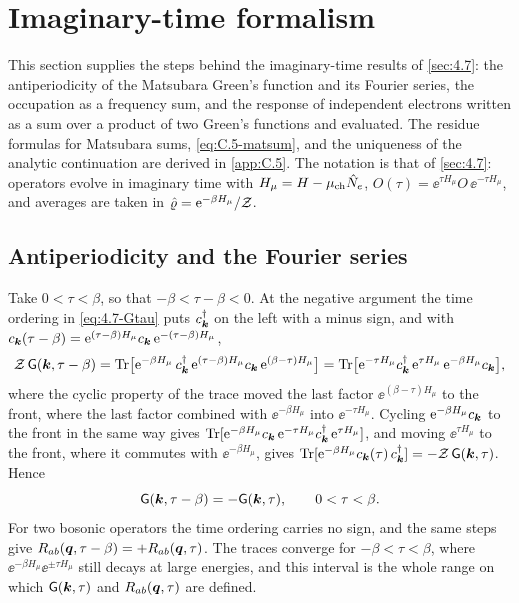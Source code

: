 \section{Imaginary-time formalism}\label{app:D.10}

This section supplies the steps behind the imaginary-time results of \cref{sec:4.7}: the antiperiodicity of the Matsubara Green's function and its Fourier series, the occupation as a frequency sum, and the response of independent electrons written as a sum over a product of two Green's functions and evaluated. The residue formulas for Matsubara sums, \cref{eq:C.5-matsum}, and the uniqueness of the analytic continuation are derived in \cref{app:C.5}. The notation is that of \cref{sec:4.7}: operators evolve in imaginary time with $H_\mu = H - \mu_{\mathrm{ch}}\hat{N}_e$, $O(\tau) = \ee^{\tau H_\mu}O\,\ee^{-\tau H_\mu}$, and averages are taken in $\hat{\varrho} = \mathrm{e}^{-\beta H_\mu}/\mathcal{Z}$.

\subsection*{Antiperiodicity and the Fourier series}

Take $0 < \tau < \beta$, so that $-\beta < \tau - \beta < 0$. At the negative argument the time ordering in \cref{eq:4.7-Gtau} puts $c^\dagger_{\bm{k}}$ on the left with a minus sign, and with $c_{\bm{k}}(\tau - \beta) = \mathrm{e}^{(\tau - \beta)H_\mu}c_{\bm{k}}\,\mathrm{e}^{-(\tau - \beta)H_\mu}$,
\begin{equation*}
  \mathcal{Z}\,\mathsf{G}(\bm{k},\tau - \beta) = \operatorname{Tr}\bigl[\mathrm{e}^{-\beta H_\mu}\,c^\dagger_{\bm{k}}\,\mathrm{e}^{(\tau - \beta)H_\mu}c_{\bm{k}}\,\mathrm{e}^{(\beta - \tau)H_\mu}\bigr]
  = \operatorname{Tr}\bigl[\mathrm{e}^{-\tau H_\mu}c^\dagger_{\bm{k}}\,\mathrm{e}^{\tau H_\mu}\,\mathrm{e}^{-\beta H_\mu}c_{\bm{k}}\bigr] ,
\end{equation*}
where the cyclic property of the trace moved the last factor $\ee^{(\beta - \tau)H_\mu}$ to the front, where the last factor combined with $\ee^{-\beta H_\mu}$ into $\ee^{-\tau H_\mu}$. Cycling $\mathrm{e}^{-\beta H_\mu}c_{\bm{k}}$ to the front in the same way gives $\operatorname{Tr}[\mathrm{e}^{-\beta H_\mu}c_{\bm{k}}\,\mathrm{e}^{-\tau H_\mu}c^\dagger_{\bm{k}}\,\mathrm{e}^{\tau H_\mu}]$, and moving $\ee^{\tau H_\mu}$ to the front, where it commutes with $\ee^{-\beta H_\mu}$, gives $\operatorname{Tr}[\mathrm{e}^{-\beta H_\mu}c_{\bm{k}}(\tau)\,c^\dagger_{\bm{k}}] = -\mathcal{Z}\,\mathsf{G}(\bm{k},\tau)$. Hence
\begin{equation}
  \mathsf{G}(\bm{k},\tau - \beta) = -\mathsf{G}(\bm{k},\tau), \qquad 0 < \tau < \beta .
  \label{eq:D.10-anti}
\end{equation}
For two bosonic operators the time ordering carries no sign, and the same steps give $R_{ab}(\bm{q},\tau - \beta) = +R_{ab}(\bm{q},\tau)$. The traces converge for $-\beta < \tau < \beta$, where $\ee^{-\beta H_\mu}\ee^{\pm\tau H_\mu}$ still decays at large energies, and this interval is the whole range on which $\mathsf{G}(\bm{k},\tau)$ and $R_{ab}(\bm{q},\tau)$ are defined.

